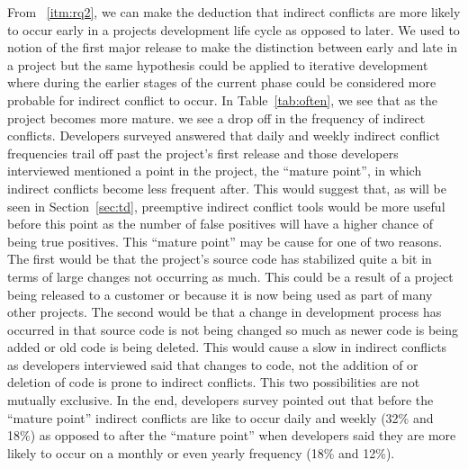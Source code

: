 \documentclass[conference]{IEEEtran}
\begin{document}
From ~\ref{itm:rq2}, we can make the deduction that indirect conflicts are more likely to occur early in a projects development life cycle as opposed
to later. We used to notion of the first major release to make the distinction between early and late in a project but the same hypothesis
could be applied to iterative development where during the earlier stages of the current phase could be considered more probable for indirect
conflict to occur. In Table~\ref{tab:often}, we see that as the project becomes more mature. we see a drop off in the frequency of indirect
conflicts. Developers surveyed answered that daily and weekly indirect conflict frequencies trail off past the project's first release and 
those developers interviewed mentioned a point in the project, the ``mature point'', in which indirect conflicts become less frequent after.
This would suggest that, as will be seen in Section~\ref{sec:td}, preemptive indirect conflict tools would be more useful before this point as the
number of false positives will have a higher chance of being true positives. This ``mature point'' may be cause for one of two reasons. The
first would be that the project's source code has stabilized quite a bit in terms of large changes not occurring as much. This could be a result
of a project being released to a customer or because it is now being used as part of many other projects. The second would be that a change in
development process has occurred in that source code is not being changed so much as newer code is being added or old code is being deleted. This
would cause a slow in indirect conflicts as developers interviewed said that changes to code, not the addition of or deletion of code is prone
to indirect conflicts. This two possibilities are not mutually exclusive. In the end, developers survey pointed out that before the ``mature
point'' indirect conflicts are like to occur daily and weekly (32\% and 18\%) as opposed to after the ``mature point'' when developers
said they are more likely to occur on a monthly or even yearly frequency (18\% and 12\%).
\end{document}
